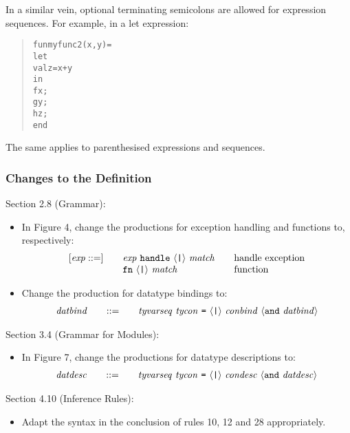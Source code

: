 \documentclass[twoside,titlepage]{article}
\begin{document}
\begin{appendix}
In a similar vein, optional terminating semicolons are allowed for expression sequences. For example, in a let expression:
\begin{quote}
\begin{alltt}
fun myfunc2(x, y) =
    let
      val z = x + y
    in
      f x;
      g y;
      h z;
    end
\end{alltt}
\end{quote}
The same applies to parenthesised expressions and sequences.


\subsubsection*{Changes to the Definition}

Section 2.8 (Grammar):
\begin{itemize}
\item In Figure 4, change the productions for exception handling and functions to, respectively:
  $$
  \begin{array}{l@{\qquad}l@{\qquad}l}
  [\mathit{exp} ::=] & \mathit{exp}~{\tt{handle}}~\langle\mbox{\tt|}\rangle~\mathit{match} & \textrm{handle exception} \\
  & {\tt{fn}}~\langle\mbox{\tt|}\rangle~\mathit{match} & \textrm{function}
  \end{array}
  $$

\item Change the production for datatype bindings to:
  $$
  \begin{array}{l@{\qquad}l@{\qquad}l}
  \mathit{datbind} &::= & \mathit{tyvarseq}~\mathit{tycon}~\mbox{\tt=}~\langle\mbox{\tt|}\rangle~\mathit{conbind}~\langle{\tt{and}}~\mathit{datbind}\rangle
  \end{array}
  $$
\end{itemize}

Section 3.4 (Grammar for Modules):
\begin{itemize}
\item In Figure 7, change the productions for datatype descriptions to:
  $$
  \begin{array}{l@{\qquad}l@{\qquad}l}
  \mathit{datdesc} &::= & \mathit{tyvarseq}~\mathit{tycon}~\mbox{\tt=}~\langle\mbox{\tt|}\rangle~\mathit{condesc}~\langle{\tt{and}}~\mathit{datdesc}\rangle
  \end{array}
  $$
\end{itemize}

Section 4.10 (Inference Rules):
\begin{itemize}
\item Adapt the syntax in the conclusion of rules 10, 12 and 28 appropriately.
\end{itemize}


\end{appendix}
\end{document}
